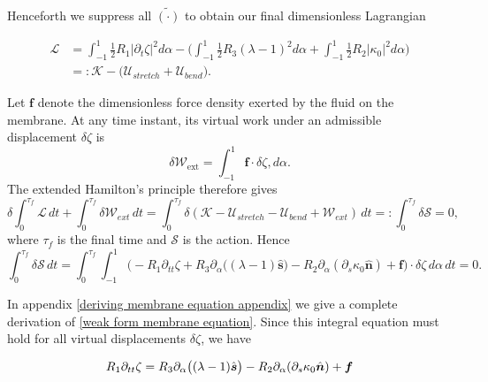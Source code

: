 \documentclass{article}[12pt]
\theoremstyle{Theorem}
\begin{document}
Henceforth we suppress all $\tilde{(\cdot)}$ to obtain our final dimensionless Lagrangian 

\begin{align}
\mathcal{L}&= \int_{-1}^1 \frac{1}{2}R_1 |\partial_{t} \zeta|^2d\alpha - \bigg(\int_{-1}^1\frac{1}{2}R_3(\lambda-1)^2d\alpha + \int_{-1}^{1}\frac{1}{2}R_2|\kappa_0|^2d\alpha \bigg)
\\
    &=: \mathcal{K} - \bigg(\mathcal{U}_{stretch} + \mathcal{U}_{bend} \bigg).
\end{align}

Let $\boldsymbol{f}$ denote the dimensionless force density exerted by the fluid on the membrane. At any time instant, its virtual work under an admissible displacement $\delta\zeta$ is
\begin{equation}
\delta\mathcal{W}_{\mathrm{ext}}
= \int_{-1}^1\boldsymbol{f}\cdot\delta\zeta,d\alpha .
\end{equation}
The extended Hamilton's principle \cite[pp.~268--272]{meirovitch2001fundamentals} therefore gives
\begin{equation}
\delta\int_0^{\tau_f}
\mathcal{L}\,dt
+
\int_0^{\tau_f}\delta\mathcal{W}_{ext}\,dt = 
\int_0^{\tau_f}
\delta\left(
\mathcal{K}
-\mathcal{U}_{stretch}
-\mathcal{U}_{bend}
+ \mathcal{W}_{ext}
\right)\,dt
=:\int_0^{\tau_f}\delta\mathcal{S}
=0,
\end{equation}
where $\tau_f$ is the final time and $\mathcal{S}$ is the action. Hence
\begin{equation}
\int_0^{\tau_f}\delta\mathcal{S}\,dt =\int_0^{\tau_f}\int_{-1}^1
\bigg(
-R_1\partial_{tt}\zeta
+R_3\partial_\alpha\big((\lambda-1)\hat{\boldsymbol{s}}\big)
-R_2\partial_\alpha(\partial_s\kappa_0\hat{\boldsymbol{n}})
+\boldsymbol{f}
\bigg)\cdot\delta\zeta\,d\alpha\,dt
=0.
\label{weak form membrane equation}
\end{equation}

In appendix \ref{deriving membrane equation appendix} we give a complete derivation of \eqref{weak form membrane equation}. Since this integral equation must hold for all virtual displacements $\delta\zeta$, we have 

\begin{equation}
     R_1\partial_{tt}\zeta  = R_3\partial_\alpha\big( (\lambda-1)\hat{\boldsymbol{s}}\big)- R_2\partial_\alpha( \partial_s\kappa_0\hat{\boldsymbol{n}}) \\ +\boldsymbol{f}
     \label{dimensionless membrane equation with arbitrary force}
\end{equation}
\end{document}
